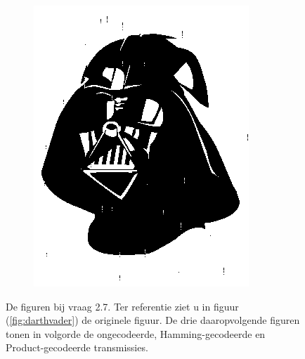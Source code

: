 \documentclass[]{article}
\begin{document}
\begin{section}
\begin{subsection}
\begin{figure}[h]
\begin{subfigure}{0.24\textwidth}
                \includegraphics[width=\textwidth]{prod_coded.png}
                \caption{}
                \label{fig:prod_coded}
            \end{subfigure}

            \caption{De figuren bij vraag 2.7. Ter referentie ziet u in
                figuur (\ref{fig:darthvader}) de originele figuur. De
                drie daaropvolgende figuren tonen in volgorde de
                ongecodeerde, Hamming-gecodeerde en Product-gecodeerde
            transmissies.}

            \label{fig:2_7}

        \end{figure}
    \end{subsection} 
\end{section}
\clearpage
\end{document}
